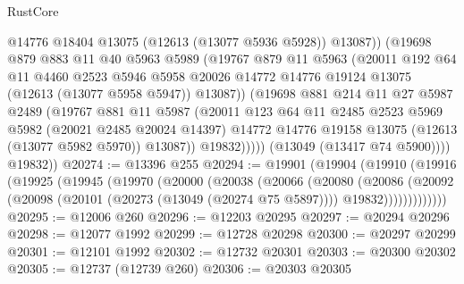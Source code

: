 \begin{lexlean}{RustCore}
\begin{coremodule}
                      @14776
                      @18404
                      @13075
                      (@12613 (@13077 @5936 @5928))
                      @13087))
                  (@19698
                    @879
                    @883
                    @11
                    @40
                    @5963
                    @5989
                    (@19767
                      @879
                      @11
                      @5963
                      (@20011
                        @192
                        @64
                        @11
                        @4460
                        @2523
                        @5946
                        @5958
                        @20026
                        @14772
                        @14776
                        @19124
                        @13075
                        (@12613 (@13077 @5958 @5947))
                        @13087))
                    (@19698
                      @881
                      @214
                      @11
                      @27
                      @5987
                      @2489
                      (@19767
                        @881
                        @11
                        @5987
                        (@20011
                          @123
                          @64
                          @11
                          @2485
                          @2523
                          @5969
                          @5982
                          (@20021 @2485 @20024 @14397)
                          @14772
                          @14776
                          @19158
                          @13075
                          (@12613 (@13077 @5982 @5970))
                          @13087))
                      @19832)))))
            (@13049 (@13417 @74 @5900))))
        @19832))
@20274 := @13396 @255
@20294 := @19901
    (@19904
      (@19910
        (@19916
          (@19925
            (@19945
              (@19970
                (@20000
                  (@20038
                    (@20066
                      (@20080
                        (@20086
                          (@20092
                            (@20098
                              (@20101 (@20273 (@13049 (@20274 @75 @5897))))
                              @19832)))))))))))))
@20295 := @12006 @260
@20296 := @12203 @20295
@20297 := @20294 @20296
@20298 := @12077 @1992
@20299 := @12728 @20298
@20300 := @20297 @20299
@20301 := @12101 @1992
@20302 := @12732 @20301
@20303 := @20300 @20302
@20305 := @12737 (@12739 @260)
@20306 := @20303 @20305

\end{coremodule}
\end{lexlean}
